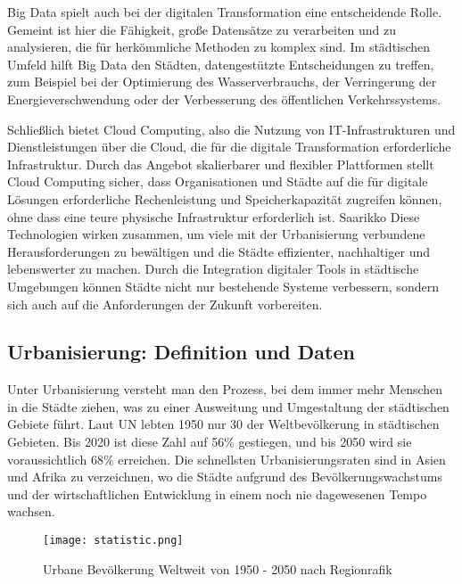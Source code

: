 \documentclass[conference,compsoc,final,a4paper, onecolumn, 11pt]{IEEEtran}
\begin{document}
Big Data spielt auch bei der digitalen Transformation eine entscheidende Rolle. 
Gemeint ist hier die Fähigkeit, große Datensätze zu verarbeiten und zu analysieren, die für herkömmliche Methoden zu komplex sind. 
Im städtischen Umfeld hilft Big Data den Städten, datengestützte Entscheidungen zu treffen, zum Beispiel bei der Optimierung des Wasserverbrauchs, der Verringerung der Energieverschwendung oder der Verbesserung des öffentlichen Verkehrssystems. \autocite{ma_role_2024}

Schließlich bietet Cloud Computing, also die Nutzung von IT-Infrastrukturen und Dienstleistungen über die Cloud, die für die digitale Transformation erforderliche Infrastruktur. 
Durch das Angebot skalierbarer und flexibler Plattformen stellt Cloud Computing sicher, dass Organisationen und Städte auf die für digitale Lösungen erforderliche Rechenleistung und Speicherkapazität zugreifen können, ohne dass eine teure physische Infrastruktur erforderlich ist. 
Saarikko 
Diese Technologien wirken zusammen, um viele mit der Urbanisierung verbundene Herausforderungen zu bewältigen und die Städte effizienter, nachhaltiger und lebenswerter zu machen. 
Durch die Integration digitaler Tools in städtische Umgebungen können Städte nicht nur bestehende Systeme verbessern, sondern sich auch auf die Anforderungen der Zukunft vorbereiten.


\subsection{Urbanisierung: Definition und Daten}
Unter Urbanisierung versteht man den Prozess, bei dem immer mehr Menschen in die Städte ziehen, was zu einer Ausweitung und Umgestaltung der städtischen Gebiete führt. 
Laut \ac{UN} lebten 1950 nur 30 der Weltbevölkerung in städtischen Gebieten. 
Bis 2020 ist diese Zahl auf 56\% gestiegen, und bis 2050 wird sie voraussichtlich 68\% erreichen. 
Die schnellsten Urbanisierungsraten sind in Asien und Afrika zu verzeichnen, wo die Städte aufgrund des Bevölkerungswachstums und der wirtschaftlichen Entwicklung in einem noch nie dagewesenen Tempo wachsen. \autocite[S. 6f]{Taubenbock2015-pj}

\begin{figure}[!ht]
  \centering
  \texttt{[image: statistic.png]}
  \caption{Urbane Bevölkerung Weltweit von 1950 - 2050 nach Regionrafik~\cite{noauthor_change_nodate}}
  \label{statistic}
\end{figure}
\end{document}

